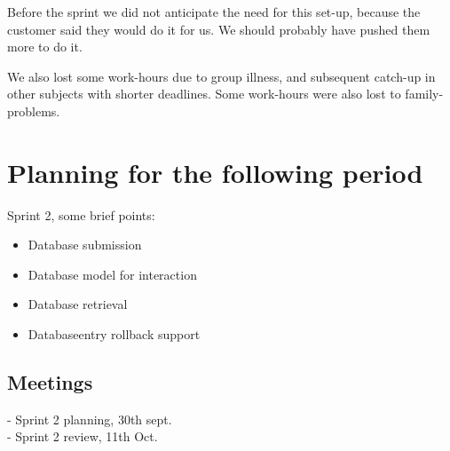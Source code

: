 \documentclass[12pt, a4paper]{article}
\begin{document}
Before the sprint we did not anticipate the need for this set-up, because the customer said they would do
it for us. We should probably have pushed them more to do it.

We also lost some work-hours due to group illness, and subsequent catch-up in other subjects with shorter deadlines. Some work-hours were also lost to family-problems. 

\section{Planning for the following period}
Sprint 2, some brief points:\\
\begin{itemize}
\item Database submission
\item Database model for interaction
\item Database retrieval
\item Databaseentry rollback support
\end{itemize}
\subsection{Meetings}
- Sprint 2 planning, 30th sept.\\
- Sprint 2 review, 11th Oct.
\newpage
\end{document}

